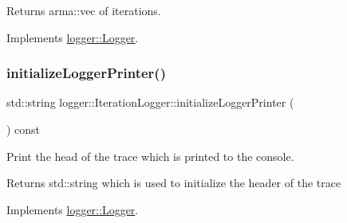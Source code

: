 \begin{DoxyReturn}{Returns}
{\ttfamily arma\+::vec} of iterations. 
\end{DoxyReturn}


Implements \mbox{\hyperlink{classlogger_1_1_logger_aa4fc254c532172db3404b7c0bcd17092}{logger\+::\+Logger}}.

\mbox{\label{classlogger_1_1_iteration_logger_ac4ba1eb6419eef2a3c21e9a4323aec1c}} 
\subsubsection{\texorpdfstring{initialize\+Logger\+Printer()}{initializeLoggerPrinter()}}
{\footnotesize\ttfamily std\+::string logger\+::\+Iteration\+Logger\+::initialize\+Logger\+Printer (\begin{DoxyParamCaption}{ }\end{DoxyParamCaption}) const\hspace{0.3cm}{\ttfamily [virtual]}}



Print the head of the trace which is printed to the console. 

\begin{DoxyReturn}{Returns}
{\ttfamily std\+::string} which is used to initialize the header of the trace 
\end{DoxyReturn}


Implements \mbox{\hyperlink{classlogger_1_1_logger_a825f96e8564ac4013ff09ef842c0aeec}{logger\+::\+Logger}}.

\mbox{\label{classlogger_1_1_iteration_logger_a36437ff3a6e6a617f6d2107eab9fba7a}} 
